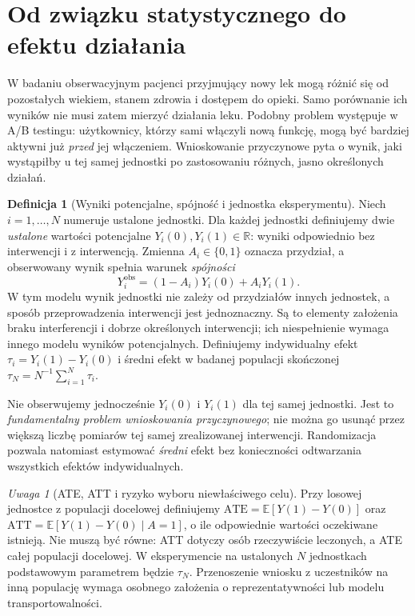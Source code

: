 \documentclass[11pt,a4paper,oneside]{report}
\numberwithin{equation}{chapter}
\theoremstyle{plain}
\theoremstyle{definition}
\newtheorem{definicja}{Definicja}[chapter]
\theoremstyle{remark}
\newtheorem{uwaga}{Uwaga}[chapter]
\newcommand{\R}{\mathbb R}
\newcommand{\E}{\mathbb E}
\begin{document}
\section{Od związku statystycznego do efektu działania}
W badaniu obserwacyjnym pacjenci przyjmujący nowy lek mogą różnić się od pozostałych wiekiem, stanem zdrowia i dostępem do opieki. Samo porównanie ich wyników nie musi zatem mierzyć działania leku. Podobny problem występuje w A/B testingu: użytkownicy, którzy sami włączyli nową funkcję, mogą być bardziej aktywni już \emph{przed} jej włączeniem. Wnioskowanie przyczynowe pyta o wynik, jaki wystąpiłby u tej samej jednostki po zastosowaniu różnych, jasno określonych działań.

\begin{definicja}[Wyniki potencjalne, spójność i jednostka eksperymentu]\label{def:potential-outcomes}
Niech $i=1,\ldots,N$ numeruje ustalone jednostki. Dla każdej jednostki definiujemy dwie \emph{ustalone} wartości potencjalne $Y_i(0),Y_i(1)\in\R$: wyniki odpowiednio bez interwencji i z interwencją. Zmienna $A_i\in\{0,1\}$ oznacza przydział, a obserwowany wynik spełnia warunek \emph{spójności}
\[
Y_i^{\mathrm{obs}}=(1-A_i)Y_i(0)+A_iY_i(1).
\]
W tym modelu wynik jednostki nie zależy od przydziałów innych jednostek, a sposób przeprowadzenia interwencji jest jednoznaczny. Są to elementy założenia braku interferencji i dobrze określonych interwencji; ich niespełnienie wymaga innego modelu wyników potencjalnych.
Definiujemy indywidualny efekt $\tau_i=Y_i(1)-Y_i(0)$ i średni efekt w badanej populacji skończonej $\tau_N=N^{-1}\sum_{i=1}^N\tau_i$.
\end{definicja}

Nie obserwujemy jednocześnie $Y_i(0)$ i $Y_i(1)$ dla tej samej jednostki. Jest to \emph{fundamentalny problem wnioskowania przyczynowego}; nie można go usunąć przez większą liczbę pomiarów tej samej zrealizowanej interwencji. Randomizacja pozwala natomiast estymować \emph{średni} efekt bez konieczności odtwarzania wszystkich efektów indywidualnych.

\begin{uwaga}[ATE, ATT i ryzyko wyboru niewłaściwego celu]
Przy losowej jednostce z populacji docelowej definiujemy $\mathrm{ATE}=\E[Y(1)-Y(0)]$ oraz $\mathrm{ATT}=\E[Y(1)-Y(0)\mid A=1]$, o ile odpowiednie wartości oczekiwane istnieją. Nie muszą być równe: ATT dotyczy osób rzeczywiście leczonych, a ATE całej populacji docelowej. W eksperymencie na ustalonych $N$ jednostkach podstawowym parametrem będzie $\tau_N$. Przenoszenie wniosku z uczestników na inną populację wymaga osobnego założenia o reprezentatywności lub modelu transportowalności.
\end{uwaga}
\end{document}
